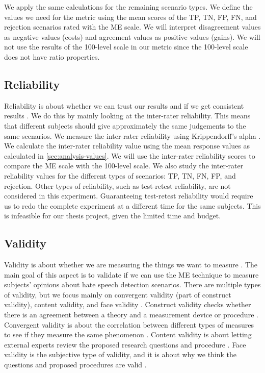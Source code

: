 \documentclass[a4paper]{article}
\begin{document}
We apply the same calculations for the remaining scenario types. We define the values we need for the metric using the mean scores of the TP, TN, FP, FN, and rejection scenarios rated with the ME scale. We will interpret disagreement values as negative values (costs) and agreement values as positive values (gains). We will not use the results of the 100-level scale in our metric since the 100-level scale does not have ratio properties.

\subsection{Reliability}
Reliability is about whether we can trust our results and if we get consistent results \cite{fitzner2007reliability}. We do this by mainly looking at the inter-rater reliability. This means that different subjects should give approximately the same judgements to the same scenarios. We measure the inter-rater reliability using Krippendorff's alpha \cite{maddalena2017crowdsourcing, krippendorff2004reliability}. We calculate the inter-rater reliability value using the mean response values as calculated in \ref{sec:analysis-values}. We will use the inter-rater reliability scores to compare the ME scale with the 100-level scale. We also study the inter-rater reliability values for the different types of scenarios: TP, TN, FN, FP, and rejection. Other types of reliability, such as test-retest reliability, are not considered in this experiment. Guaranteeing test-retest reliability would require us to redo the complete experiment at a different time for the same subjects. This is infeasible for our thesis project, given the limited time and budget.

\subsection{Validity}
\label{sec:analysis-validity}
Validity is about whether we are measuring the things we want to measure \cite{fitzner2007reliability}. The main goal of this aspect is to validate if we can use the ME technique to measure subjects' opinions about hate speech detection scenarios. There are multiple types of validity, but we focus mainly on convergent validity (part of construct validity), content validity, and face validity \cite{fitzner2007reliability}. Construct validity checks whether there is an agreement between a theory and a measurement device or procedure \cite{fitzner2007reliability}. Convergent validity is about the correlation between different types of measures to see if they measure the same phenomenon \cite{fitzner2007reliability}. Content validity is about letting external experts review the proposed research questions and procedure \cite{fitzner2007reliability}. Face validity is the subjective type of validity, and it is about why we think the questions and proposed procedures are valid \cite{fitzner2007reliability}.
\end{document}

